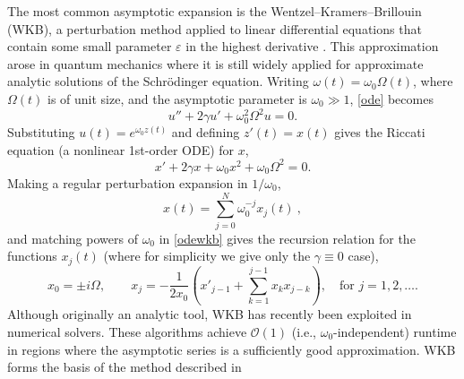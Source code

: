 \documentclass[10pt]{article}
\newcommand{\be}{\begin{equation}}
\newcommand{\ee}{\end{equation}}
\newcommand{\bigO}{{\mathcal O}}
\newcommand{\om}{\omega}
\begin{document}


The most common asymptotic expansion
is the Wentzel--Kramers--Brillouin (WKB), a
perturbation method applied to linear differential equations that contain some
small parameter $\varepsilon$ in the highest derivative
\cite{benderorszag,logan}.
This approximation arose in quantum mechanics where it is still widely
applied for approximate analytic solutions of the Schr\"{o}dinger equation.
Writing $\om(t) = \om_0\Omega(t)$,
where $\Omega(t)$ is of unit size, and the asymptotic parameter is
$\om_0 \gg 1$,    %
\cref{ode} becomes
\be\label{odewkb}
u'' + 2\gamma u' + \om_0^2 \Omega^2 u = 0.
\ee
Substituting $u(t) = e^{\om_0 z(t)}$ and defining $z'(t) = x(t)$
gives the Riccati equation (a nonlinear 1st-order ODE) for $x$, 
\be\label{riccwkb}
x' + 2\gamma x + \om_0 x^2 + \om_0 \Omega^2 = 0.
\ee
Making a regular perturbation expansion in $1/\om_0$,
\be\label{wkbexpansion}
x(t) = \sum_{j=0}^{N} \om_0^{-j} x_j(t)~,
\ee
and matching powers of $\om_0$ in \cref{odewkb} gives the recursion relation
for the functions $x_j(t)$
(where for simplicity we give only the $\gamma \equiv 0$ case),
\begin{equation}\label{wkbrecur}
  x_0 = \pm i\Omega, \qquad x_j = -\frac{1}{2x_0}\left( x'_{j-1} + \sum_{k = 1}^{j-1}x_k x_{j-k} \right), \quad \text{for } j = 1, 2, \ldots.
\end{equation}
Although originally an analytic tool,
WKB has recently been exploited in numerical solvers.
These algorithms achieve
$\bigO(1)$ (i.e., $\om_0$-independent) runtime in regions where the asymptotic
series is a sufficiently good approximation.
WKB forms the basis of the method described in
\end{document}
